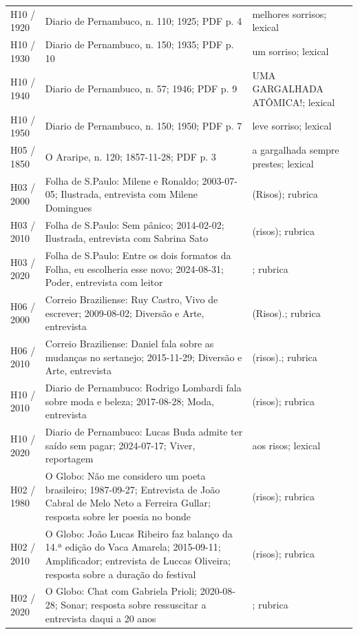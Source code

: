 \begin{longtable}{>{\raggedright\arraybackslash}p{}>{\raggedright\arraybackslash}p{}>{\raggedright\arraybackslash}p{}}
H10 / 1920 & Diario de Pernambuco, n. 110; 1925; PDF p. 4 & melhores sorrisos; lexical \cite{acervoD046} \\
H10 / 1930 & Diario de Pernambuco, n. 150; 1935; PDF p. 10 & um sorriso; lexical \cite{acervoD047} \\
H10 / 1940 & Diario de Pernambuco, n. 57; 1946; PDF p. 9 & UMA GARGALHADA ATÔMICA!; lexical \cite{acervoD048} \\
H10 / 1950 & Diario de Pernambuco, n. 150; 1950; PDF p. 7 & leve sorriso; lexical \cite{acervoD049} \\
H05 / 1850 & O Araripe, n. 120; 1857-11-28; PDF p. 3 & a gargalhada sempre prestes; lexical \cite{acervoD050} \\
H03 / 2000 & Folha de S.Paulo: Milene e Ronaldo; 2003-07-05; Ilustrada, entrevista com Milene Domingues & (Risos); rubrica \cite{acervoD051} \\
H03 / 2010 & Folha de S.Paulo: Sem pânico; 2014-02-02; Ilustrada, entrevista com Sabrina Sato & (risos); rubrica \cite{acervoD052} \\
H03 / 2020 & Folha de S.Paulo: Entre os dois formatos da Folha, eu escolheria esse novo; 2024-08-31; Poder, entrevista com leitor & [risos]; rubrica \cite{acervoD053} \\
H06 / 2000 & Correio Braziliense: Ruy Castro, Vivo de escrever; 2009-08-02; Diversão e Arte, entrevista & (Risos).; rubrica \cite{acervoD054} \\
H06 / 2010 & Correio Braziliense: Daniel fala sobre as mudanças no sertanejo; 2015-11-29; Diversão e Arte, entrevista & (risos).; rubrica \cite{acervoD055} \\
H10 / 2010 & Diario de Pernambuco: Rodrigo Lombardi fala sobre moda e beleza; 2017-08-28; Moda, entrevista & (risos); rubrica \cite{acervoD056} \\
H10 / 2020 & Diario de Pernambuco: Lucas Buda admite ter saído sem pagar; 2024-07-17; Viver, reportagem & aos risos; lexical \cite{acervoD057} \\
H02 / 1980 & O Globo: Não me considero um poeta brasileiro; 1987-09-27; Entrevista de João Cabral de Melo Neto a Ferreira Gullar; resposta sobre ler poesia no bonde & (risos); rubrica \cite{acervoD058} \\
H02 / 2010 & O Globo: João Lucas Ribeiro faz balanço da 14.ª edição do Vaca Amarela; 2015-09-11; Amplificador; entrevista de Luccas Oliveira; resposta sobre a duração do festival & (risos); rubrica \cite{acervoD059} \\
H02 / 2020 & O Globo: Chat com Gabriela Prioli; 2020-08-28; Sonar; resposta sobre ressuscitar a entrevista daqui a 20 anos & [risos]; rubrica \cite{acervoD060} \\

\end{longtable}
